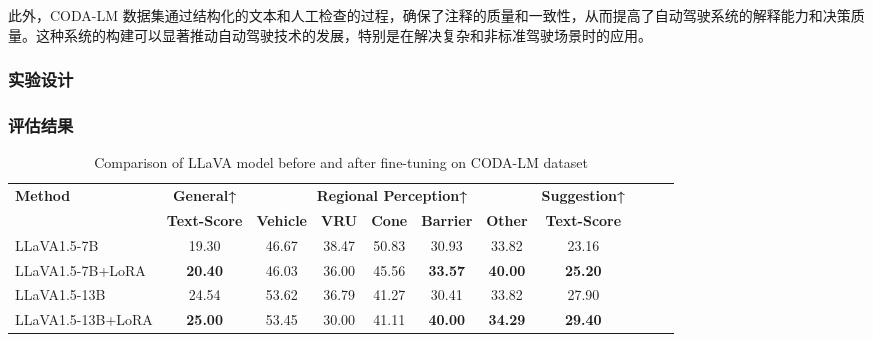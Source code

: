 \documentclass[
    linespread = 1.25
]{ctexart}
\begin{document}
此外，CODA-LM 数据集通过结构化的文本和人工检查的过程，确保了注释的质量和一致性，从而提高了自动驾驶系统的解释能力和决策质量。这种系统的构建可以显著推动自动驾驶技术的发展，特别是在解决复杂和非标准驾驶场景时的应用。

\subsubsection{实验设计}
\subsubsection{评估结果}

\begin{table}[htbp]
  \centering
  \caption{Comparison of LLaVA model before and after fine-tuning on CODA-LM dataset}
  \small %
  \begin{tabular}{lcccccccccc}
    \toprule
    \textbf{Method}   & \textbf{General↑}   & \multicolumn{5}{c}{\textbf{Regional Perception↑}} & \textbf{Suggestion↑}                                                                           \\
    \cmidrule(r){3-7}
                      & \textbf{Text-Score} & \textbf{Vehicle}                                  & \textbf{VRU}         & \textbf{Cone} & \textbf{Barrier} & \textbf{Other} & \textbf{Text-Score} \\
    \midrule
    LLaVA1.5-7B       & 19.30               & 46.67                                             & 38.47                & 50.83         & 30.93            & 33.82          & 23.16               \\
    LLaVA1.5-7B+LoRA  & \textbf{20.40}      & 46.03                                             & 36.00                & 45.56         & \textbf{33.57}   & \textbf{40.00} & \textbf{25.20}      \\
    \midrule
    LLaVA1.5-13B      & 24.54               & 53.62                                             & 36.79                & 41.27         & 30.41            & 33.82          & 27.90               \\
    LLaVA1.5-13B+LoRA & \textbf{25.00}      & 53.45                                             & 30.00                & 41.11         & \textbf{40.00}   & \textbf{34.29} & \textbf{29.40}      \\
    \bottomrule
  \end{tabular}
\end{table}
\end{document}
